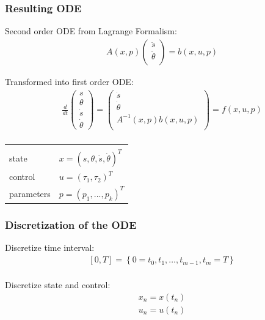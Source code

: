 \begin{frame}[c]
	\frametitle{Resulting ODE}
	
	Second order ODE from Lagrange Formalism:
	\begin{align*}
	  &A(x,p)
	  \begin{pmatrix} 
	    \ddot{s} \\ \ddot{\theta} \\
	  \end{pmatrix}
	  = b(x,u,p)
	\end{align*}
	
	Transformed into first order ODE:
	\begin{align*}
	  &\frac{d}{dt}
	  \begin{pmatrix}
	  s \\ \theta \\ \dot{s} \\ \dot{\theta}
	  \end{pmatrix}
	  =
	  \begin{pmatrix}
	    \dot{s} \\ \dot{\theta} \\ A^{-1}(x,p)b(x,u,p) \\
	  \end{pmatrix} 
	  = f(x,u,p) \\
	\end{align*}
	
	\vspace{-1.0cm}
	
	\begin{tabular}{ll}
	  & \\
	  state & $ x = (s,\theta,\dot{s},\dot{\theta})^T $ \\
	  control & $ u = (\tau_1,\tau_2)^T $ \\
	  parameters & $ p = (p_1,...,p_k)^T $ \\
	\end{tabular}
\end{frame}

\begin{frame}
	\frametitle{Discretization of the ODE}
	
	
	Discretize time interval:
	\begin{align*}
	  &[0,T] = \left\{ 0=t_0, t_1, \dots, t_{m-1}, t_{m}=T \right\} \\
	\end{align*}
	
	Discretize state and control:
	\begin{align*}
	  &x_n = x(t_n) \\
	  &u_n = u(t_n) \\
	\end{align*}
	
\end{frame}

